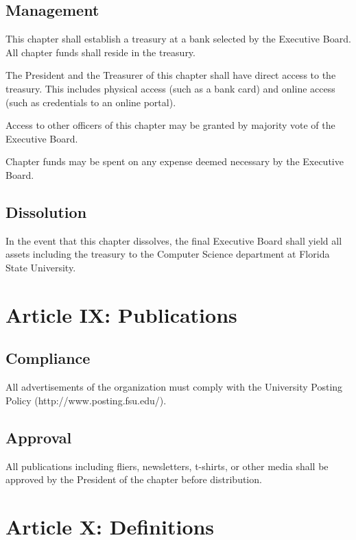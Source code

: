 \documentclass{article}
\begin{document}
\subsection{Management}

This chapter shall establish a treasury at a bank selected by the
Executive Board. All chapter funds shall reside in the treasury.

The President and the Treasurer of this chapter shall have direct access
to the treasury. This includes physical access (such as a bank card) and
online access (such as credentials to an online portal).

Access to other officers of this chapter may be granted by majority vote
of the Executive Board.

Chapter funds may be spent on any expense deemed necessary by the
Executive Board.

\subsection{Dissolution}

In the event that this chapter dissolves, the final Executive Board
shall yield all assets including the treasury to the Computer Science
department at Florida State University.

\section{Article IX: Publications}


\subsection{Compliance}

All advertisements of the organization must comply with the University
Posting Policy (http://www.posting.fsu.edu/).

\subsection{Approval}

All publications including fliers, newsletters, t-shirts, or other media
shall be approved by the President of the chapter before distribution.

\section{Article X: Definitions}
\end{document}
